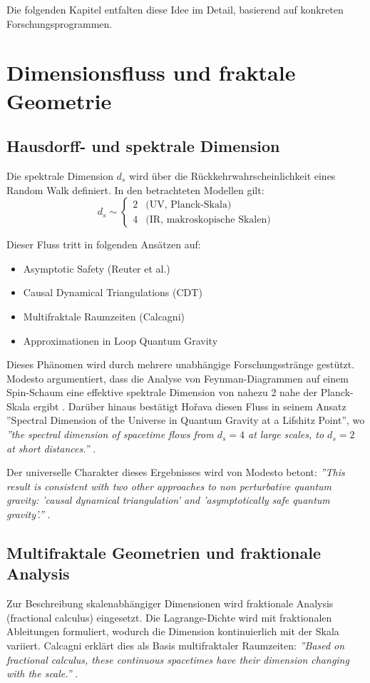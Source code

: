 	Die folgenden Kapitel entfalten diese Idee im Detail, basierend auf konkreten Forschungsprogrammen.
	
	\section{Dimensionsfluss und fraktale Geometrie}
	
	\subsection{Hausdorff- und spektrale Dimension}
	Die spektrale Dimension $d_s$ wird über die Rückkehrwahrscheinlichkeit eines Random Walk definiert. In den betrachteten Modellen gilt:
	\begin{equation}
		d_s \sim 
		\begin{cases} 
			2 & \text{(UV, Planck-Skala)} \\
			4 & \text{(IR, makroskopische Skalen)}
		\end{cases}
	\end{equation}
	
	Dieser Fluss tritt in folgenden Ansätzen auf:
	\begin{itemize}
		\item Asymptotic Safety (Reuter et al.)
		\item Causal Dynamical Triangulations (CDT)
		\item Multifraktale Raumzeiten (Calcagni)
		\item Approximationen in Loop Quantum Gravity
	\end{itemize}
	
	Dieses Phänomen wird durch mehrere unabhängige Forschungsstränge gestützt. Modesto argumentiert, dass die Analyse von Feynman-Diagrammen auf einem Spin-Schaum eine effektive spektrale Dimension von nahezu 2 nahe der Planck-Skala ergibt \cite{Modesto2008}. Darüber hinaus bestätigt Hořava diesen Fluss in seinem Ansatz ''Spectral Dimension of the Universe in Quantum Gravity at a Lifshitz Point'', wo \textit{''the spectral dimension of spacetime flows from $d_s=4$ at large scales, to $d_s=2$ at short distances.''} \cite{Horava2009}.
	
	Der universelle Charakter dieses Ergebnisses wird von Modesto betont: \textit{''This result is consistent with two other approaches to non perturbative quantum gravity: 'causal dynamical triangulation' and 'asymptotically safe quantum gravity'.''} \cite{Modesto2009}.
	
	\subsection{Multifraktale Geometrien und fraktionale Analysis}
	Zur Beschreibung skalenabhängiger Dimensionen wird fraktionale Analysis (fractional calculus) eingesetzt. Die Lagrange-Dichte wird mit fraktionalen Ableitungen formuliert, wodurch die Dimension kontinuierlich mit der Skala variiert. Calcagni erklärt dies als Basis multifraktaler Raumzeiten: \textit{''Based on fractional calculus, these continuous spacetimes have their dimension changing with the scale.''} \cite{Calcagni2012}.
	

